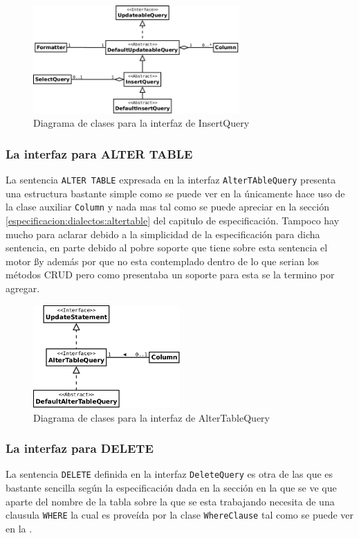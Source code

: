 \begin{figure}
  \centering
    \includegraphics[width=0.7\textwidth]{figuras/jdbgm-dc-insert.png}
  \caption{Diagrama de clases para la interfaz de InsertQuery}
  \label{fig:dc-insertquery}
\end{figure}

\subsubsection{La interfaz para ALTER TABLE}
La sentencia \verb=ALTER TABLE= expresada en la interfaz \verb=AlterTAbleQuery= presenta una estructura bastante simple como se puede ver en la  únicamente hace uso de la clase auxiliar \verb=Column= y nada mas tal como se puede apreciar en la sección \ref{especificacion:dialectos:altertable} del capitulo de especificación. Tampoco hay mucho para aclarar debido a la simplicidad de la especificación para dicha sentencia, en parte debido al pobre soporte que tiene sobre esta sentencia el motor \ss y además por que no esta contemplado dentro de lo que serian los métodos CRUD pero como \cc presentaba un soporte para esta se la termino por agregar.
\begin{figure}
  \centering
    \includegraphics[width=0.5\textwidth]{figuras/jdbgm-dc-altertable.png}
  \caption{Diagrama de clases para la interfaz de AlterTableQuery}
  \label{fig:dc-altertabletquery}
\end{figure}

\subsubsection{La interfaz para DELETE}
La sentencia \verb=DELETE= definida en la interfaz \verb=DeleteQuery= es otra de las que es bastante sencilla según la especificación dada en la sección  en la que se ve que aparte del nombre de la tabla sobre la que se esta trabajando necesita de una clausula \verb=WHERE= la cual es proveída por la clase \verb=WhereClause= tal como se puede ver en la .

